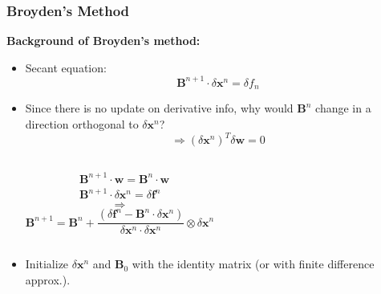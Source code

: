   \begin{frame}[fragile]
    \frametitle{Broyden's Method}
  
    \textbf{Background of Broyden’s method:}
    \begin{itemize}
      \item Secant equation:
      \[
      \textbf{B}^{n+1} \cdot \delta \textbf{x}^n = \delta f_{n}
      \]
      \item Since there is no update on derivative info, why would \(\textbf{B}^{n}\) change in a direction orthogonal to \(\delta \textbf{x}^n\)?
      \[
        \Rightarrow (\delta \textbf{x}^n)^T \delta \textbf{w} = 0
      \]
      \vspace{-0.5cm}
      \begin{columns}
        \begin{align*}
          &\textbf{B}^{n+1}\cdot\textbf{w} = \textbf{B}^{n}\cdot\textbf{w}\\
          &\textbf{B}^{n+1}\cdot\delta \textbf{x}^n = \delta \textbf{f}^n
        \end{align*}
        \[
          \Rightarrow  
        \]
        \[
          \mathbf{B}^{n+1}=\mathbf{B}^n+\frac{\left(\delta \mathbf{f}^n-\mathbf{B}^n \cdot \delta \mathbf{x}^n\right)}{\delta \mathbf{x}^n \cdot \delta \mathbf{x}^n} \otimes \delta \mathbf{x}^n
        \]
      \end{columns}
      \vspace{0.5cm}
      \item Initialize \(\delta \textbf{x}^n\) and \(\textbf{B}_{0}\) with the identity matrix (or with finite difference approx.).
    \end{itemize}
  \end{frame}


